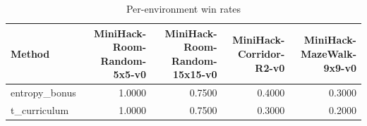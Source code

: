 \begin{table}[htbp]
\centering
\caption{Per-environment win rates}
\label{tab:per-env}
\begin{tabular}{lrrrr}
\toprule
\textbf{Method} & \textbf{MiniHack-Room-Random-5x5-v0} & \textbf{MiniHack-Room-Random-15x15-v0} & \textbf{MiniHack-Corridor-R2-v0} & \textbf{MiniHack-MazeWalk-9x9-v0} \\
\midrule
entropy\_bonus & 1.0000 & 0.7500 & 0.4000 & 0.3000 \\
t\_curriculum & 1.0000 & 0.7500 & 0.3000 & 0.2000 \\
\bottomrule
\end{tabular}
\end{table}